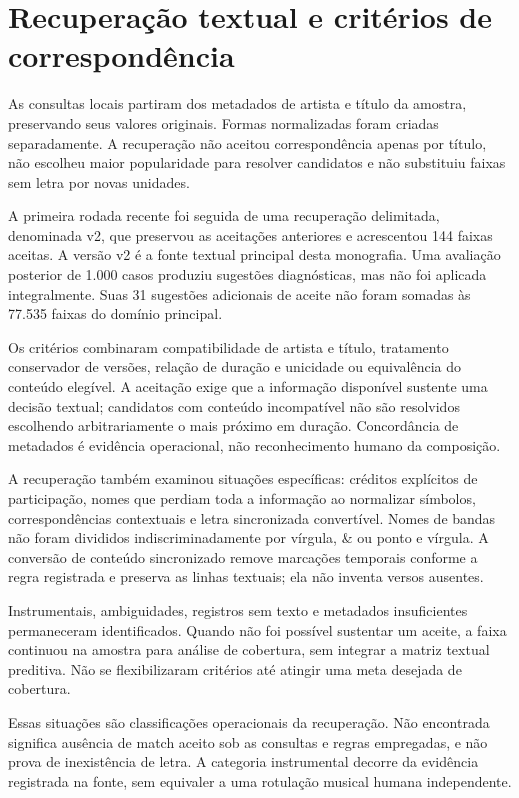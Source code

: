 \section{Recuperação textual e critérios de correspondência}
As consultas locais partiram dos metadados de artista e título da amostra, preservando seus valores originais. Formas normalizadas foram criadas separadamente. A recuperação não aceitou correspondência apenas por título, não escolheu maior popularidade para resolver candidatos e não substituiu faixas sem letra por novas unidades.

A primeira rodada recente foi seguida de uma recuperação delimitada, denominada v2, que preservou as aceitações anteriores e acrescentou 144 faixas aceitas. A versão v2 é a fonte textual principal desta monografia. Uma avaliação posterior de 1.000 casos produziu sugestões diagnósticas, mas não foi aplicada integralmente. Suas 31 sugestões adicionais de aceite não foram somadas às 77.535 faixas do domínio principal.

Os critérios combinaram compatibilidade de artista e título, tratamento conservador de versões, relação de duração e unicidade ou equivalência do conteúdo elegível. A aceitação exige que a informação disponível sustente uma decisão textual; candidatos com conteúdo incompatível não são resolvidos escolhendo arbitrariamente o mais próximo em duração. Concordância de metadados é evidência operacional, não reconhecimento humano da composição.

A recuperação também examinou situações específicas: créditos explícitos de participação, nomes que perdiam toda a informação ao normalizar símbolos, correspondências contextuais e letra sincronizada convertível. Nomes de bandas não foram divididos indiscriminadamente por vírgula, \& ou ponto e vírgula. A conversão de conteúdo sincronizado remove marcações temporais conforme a regra registrada e preserva as linhas textuais; ela não inventa versos ausentes.

Instrumentais, ambiguidades, registros sem texto e metadados insuficientes permaneceram identificados. Quando não foi possível sustentar um aceite, a faixa continuou na amostra para análise de cobertura, sem integrar a matriz textual preditiva. Não se flexibilizaram critérios até atingir uma meta desejada de cobertura.

Essas situações são classificações operacionais da recuperação. Não encontrada significa ausência de match aceito sob as consultas e regras empregadas, e não prova de inexistência de letra. A categoria instrumental decorre da evidência registrada na fonte, sem equivaler a uma rotulação musical humana independente.

